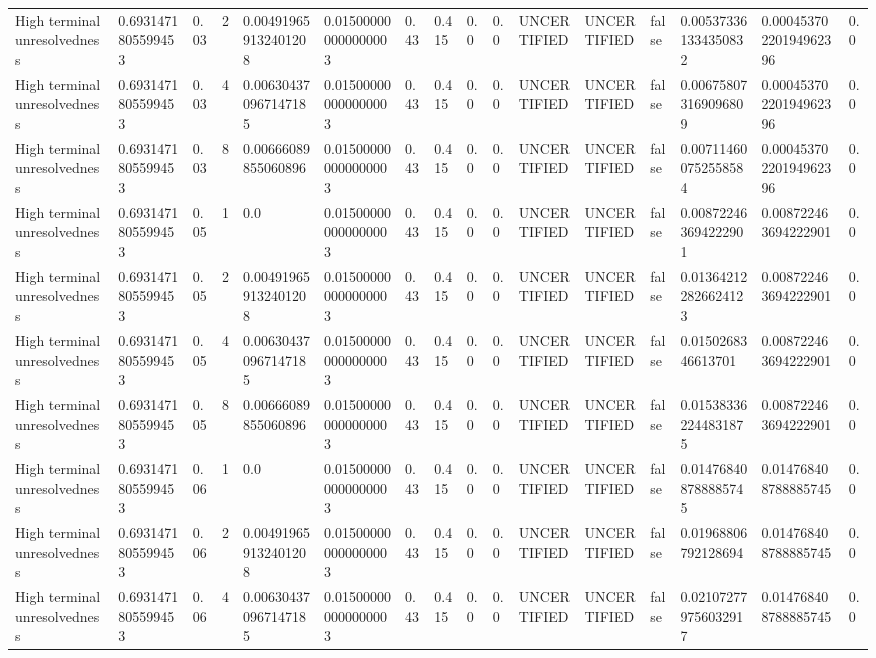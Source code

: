 \begin{tabular}{llllllllllllllll}
High terminal unresolvedness & 0.6931471805599453 & 0.03 & 2 & 0.004919659132401208 & 0.015000000000000003 & 0.43 & 0.415 & 0.0 & 0.0 & UNCERTIFIED & UNCERTIFIED & false & 0.005373361334350832 & 0.00045370220194962396 & 0.0 \\
High terminal unresolvedness & 0.6931471805599453 & 0.03 & 4 & 0.006304370967147185 & 0.015000000000000003 & 0.43 & 0.415 & 0.0 & 0.0 & UNCERTIFIED & UNCERTIFIED & false & 0.006758073169096809 & 0.00045370220194962396 & 0.0 \\
High terminal unresolvedness & 0.6931471805599453 & 0.03 & 8 & 0.00666089855060896 & 0.015000000000000003 & 0.43 & 0.415 & 0.0 & 0.0 & UNCERTIFIED & UNCERTIFIED & false & 0.007114600752558584 & 0.00045370220194962396 & 0.0 \\
High terminal unresolvedness & 0.6931471805599453 & 0.05 & 1 & 0.0 & 0.015000000000000003 & 0.43 & 0.415 & 0.0 & 0.0 & UNCERTIFIED & UNCERTIFIED & false & 0.008722463694222901 & 0.008722463694222901 & 0.0 \\
High terminal unresolvedness & 0.6931471805599453 & 0.05 & 2 & 0.004919659132401208 & 0.015000000000000003 & 0.43 & 0.415 & 0.0 & 0.0 & UNCERTIFIED & UNCERTIFIED & false & 0.013642122826624123 & 0.008722463694222901 & 0.0 \\
High terminal unresolvedness & 0.6931471805599453 & 0.05 & 4 & 0.006304370967147185 & 0.015000000000000003 & 0.43 & 0.415 & 0.0 & 0.0 & UNCERTIFIED & UNCERTIFIED & false & 0.0150268346613701 & 0.008722463694222901 & 0.0 \\
High terminal unresolvedness & 0.6931471805599453 & 0.05 & 8 & 0.00666089855060896 & 0.015000000000000003 & 0.43 & 0.415 & 0.0 & 0.0 & UNCERTIFIED & UNCERTIFIED & false & 0.015383362244831875 & 0.008722463694222901 & 0.0 \\
High terminal unresolvedness & 0.6931471805599453 & 0.06 & 1 & 0.0 & 0.015000000000000003 & 0.43 & 0.415 & 0.0 & 0.0 & UNCERTIFIED & UNCERTIFIED & false & 0.014768408788885745 & 0.014768408788885745 & 0.0 \\
High terminal unresolvedness & 0.6931471805599453 & 0.06 & 2 & 0.004919659132401208 & 0.015000000000000003 & 0.43 & 0.415 & 0.0 & 0.0 & UNCERTIFIED & UNCERTIFIED & false & 0.01968806792128694 & 0.014768408788885745 & 0.0 \\
High terminal unresolvedness & 0.6931471805599453 & 0.06 & 4 & 0.006304370967147185 & 0.015000000000000003 & 0.43 & 0.415 & 0.0 & 0.0 & UNCERTIFIED & UNCERTIFIED & false & 0.021072779756032917 & 0.014768408788885745 & 0.0 \\

\end{tabular}
